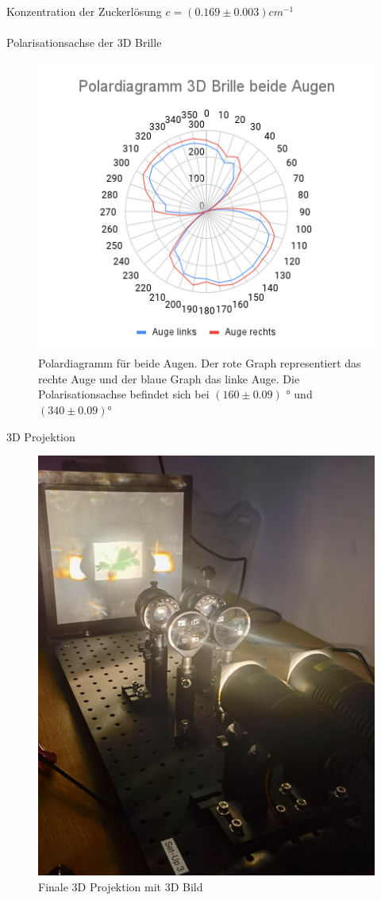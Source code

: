 \documentclass[12pt,a4paper,twoside]{article}
\begin{document}
\noindent
Konzentration der Zuckerlösung $c = (0.169 \pm 0.003) cm^{-1}$
\\
\\
Polarisationsachse der 3D Brille

\begin{figure}[H]
    \centering
    \includegraphics[width=0.6\linewidth]{nudes/Polardiagramm 3D Brille beide Augen.png}
    \caption{Polardiagramm für beide Augen. Der rote Graph representiert das rechte Auge und der blaue Graph das linke Auge. Die Polarisationsachse befindet sich bei $(160 \pm 0.09)$ ° und $(340 \pm 0.09)$°}
    \label{fig:Polardiagramm zus}
\end{figure}

\noindent
3D Projektion 
\begin{figure}[H]
    \centering
    \includegraphics[width=0.6\linewidth]{nudes/3d kino aufbau.jpg}
    \caption{Finale 3D Projektion mit 3D Bild}
    \label{fig:3D Projektion zus}
\end{figure}
\end{document}
